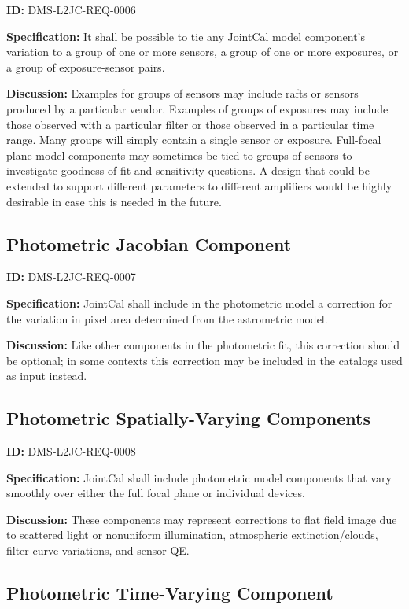 \documentclass[SE,toc,lsstdraft]{lsstdoc}
\begin{document}
\label{DMS-L2JC-REQ-0006}
\textbf{ID:} DMS-L2JC-REQ-0006

\textbf{Specification:}
It shall be possible to tie any JointCal model component's variation to a group of one or more sensors, a group of one or more exposures, or a group of exposure-sensor pairs.

\textbf{Discussion:}
Examples for groups of sensors may include rafts or sensors produced by a particular vendor.  Examples of groups of exposures may include those observed with a particular filter or those observed in a particular time range.  Many groups will simply contain a single sensor or exposure.  Full-focal plane model components may sometimes be tied to groups of sensors to investigate goodness-of-fit and sensitivity questions.  A design that could be extended to support different parameters to different amplifiers would be highly desirable in case this is needed in the future.

\subsection{Photometric Jacobian Component}

\label{DMS-L2JC-REQ-0007}
\textbf{ID:} DMS-L2JC-REQ-0007

\textbf{Specification:}
JointCal shall include in the photometric model a correction for the variation in pixel area determined from the astrometric model.

\textbf{Discussion:}
Like other components in the photometric fit, this correction should be optional; in some contexts this correction may be included in the catalogs used as input instead.

\subsection{Photometric Spatially-Varying Components}

\label{DMS-L2JC-REQ-0008}
\textbf{ID:} DMS-L2JC-REQ-0008

\textbf{Specification:}
JointCal shall include photometric model components that vary smoothly over either the full focal plane or individual devices.

\textbf{Discussion:}
These components may represent corrections to flat field image due to scattered light or nonuniform illumination, atmospheric extinction/clouds, filter curve variations, and sensor QE.

\subsection{Photometric Time-Varying Component}
\end{document}
